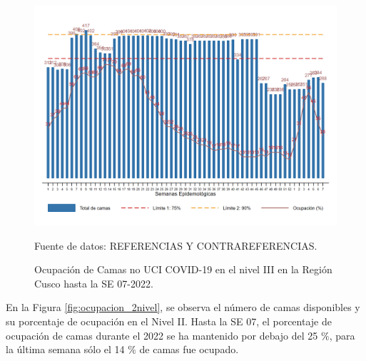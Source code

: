 \documentclass[12pt,a4paper,openany]{book}
\begin{document}
\begin{figure}[htpb]
	\caption{Ocupación de Camas no UCI COVID-19 en el nivel III en la Región Cusco hasta la SE 07-2022.}\label{fig:ocupacion_3_nivel}
	\begin{center}
		\includegraphics[width=0.95\linewidth]{../figuras/nivel_3.png}
	\end{center}
	{\footnotesize {Fuente de datos: REFERENCIAS Y CONTRAREFERENCIAS.}}
\end{figure}

\clearpage

En la Figura \ref{fig:ocupacion_2nivel}, se observa el número de camas disponibles y su porcentaje de ocupación en el Nivel II. Hasta la SE 07, el porcentaje de ocupación de camas durante el 2022 se ha mantenido por debajo del 25 $\%$, para la última semana sólo el 14 $\%$ de camas fue ocupado. 
\end{document}
